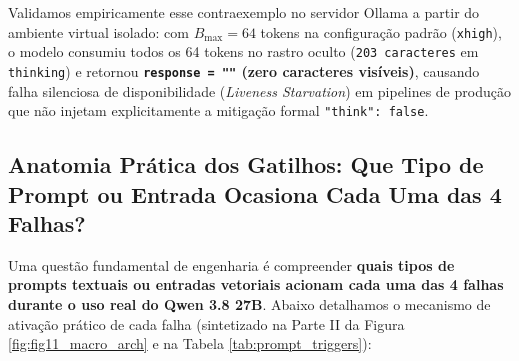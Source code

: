 \documentclass[11pt,a4paper]{article}
\theoremstyle{definition}
\begin{document}
Validamos empiricamente esse contraexemplo no servidor Ollama a partir do ambiente virtual isolado: com $B_{\max} = 64$ tokens na configuração padrão (\texttt{xhigh}), o modelo consumiu todos os 64 tokens no rastro oculto (\texttt{203 caracteres} em \texttt{thinking}) e retornou \textbf{\texttt{response = ""} (zero caracteres visíveis)}, causando falha silenciosa de disponibilidade (\textit{Liveness Starvation}) em pipelines de produção que não injetam explicitamente a mitigação formal \texttt{"think": false}.

\subsection{Anatomia Prática dos Gatilhos: Que Tipo de Prompt ou Entrada Ocasiona Cada Uma das 4 Falhas?}

Uma questão fundamental de engenharia é compreender \textbf{quais tipos de prompts textuais ou entradas vetoriais acionam cada uma das 4 falhas durante o uso real do Qwen 3.8 27B}. Abaixo detalhamos o mecanismo de ativação prático de cada falha (sintetizado na Parte II da Figura \ref{fig:fig11_macro_arch} e na Tabela \ref{tab:prompt_triggers}):
\end{document}
